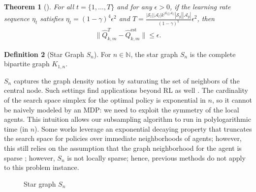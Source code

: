\documentclass{article}
\theoremstyle{plain}
\newtheorem{theorem}{Theorem}[section]
\theoremstyle{definition}
\newtheorem{definition}[theorem]{Definition}
\def\est{\mathrm{est}}
\begin{document}
\begin{theorem}[\cite{pmlr-v151-chen22i}]For all $t=\{1,\dots,T\}$ and for any $\epsilon>0$, if the learning rate sequence $\eta_t$ satisfies $\eta_t = (1-\gamma)^4 \epsilon^2$ and $T = \frac{|\mathcal{S}_l||\mathcal{A}_l| k^{|\mathcal{S}_l||\mathcal{A}_l|}|\mathcal{S}_g||\mathcal{A}_g|}{(1-\gamma)^5}\epsilon^2$, then
    \begin{align*}\|\hat{Q}_{k,m}^T - \hat{Q}_{k,m}^\est\|\leq \epsilon. \end{align*}
\end{theorem}

\begin{definition}[Star Graph $S_n$]\label{definition: star graph} For $n\in\mathbb{N}$, the star graph $S_n$ is the complete bipartite graph $K_{1,n}$.
\end{definition}
$S_n$ captures the graph density notion by saturating the set of neighbors of the central node. Such settings find applications beyond RL as well \citep{chaudhari2024peertopeerlearningdynamicswide,anand2024efficient,10.1145/3308558.3313433}. The cardinality of the search space simplex for the optimal policy is exponential in $n$, so it cannot be naively modeled by an MDP: we need to exploit the symmetry of the local agents. This intuition allows our subsampling algorithm to run in polylogarithmic time (in $n$). Some works leverage an exponential decaying property that truncates the search space for policies over immediate neighborhoods of agents; however, this still relies on the assumption that the graph neighborhood for the agent is sparse \citep{10.5555/3495724.3495899,pmlr-v120-qu20a}; however, $S_n$  is not locally sparse; hence, previous methods do not apply to this problem instance.

\begin{center}
\begin{figure}[ht]
\begin{center}
\caption{Star graph $S_n$}
\end{center}
\end{figure}
\end{center}
\end{document}

